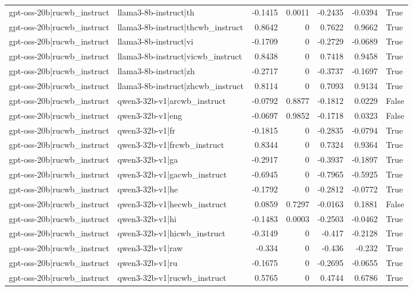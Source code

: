 \begin{table}
\begin{tabular}{l l r r r r l}
gpt-oss-20b|rucwb_instruct & llama3-8b-instruct|th & -0.1415 & 0.0011 & -0.2435 & -0.0394 & True \\
gpt-oss-20b|rucwb_instruct & llama3-8b-instruct|thcwb_instruct & 0.8642 & 0 & 0.7622 & 0.9662 & True \\
gpt-oss-20b|rucwb_instruct & llama3-8b-instruct|vi & -0.1709 & 0 & -0.2729 & -0.0689 & True \\
gpt-oss-20b|rucwb_instruct & llama3-8b-instruct|vicwb_instruct & 0.8438 & 0 & 0.7418 & 0.9458 & True \\
gpt-oss-20b|rucwb_instruct & llama3-8b-instruct|zh & -0.2717 & 0 & -0.3737 & -0.1697 & True \\
gpt-oss-20b|rucwb_instruct & llama3-8b-instruct|zhcwb_instruct & 0.8114 & 0 & 0.7093 & 0.9134 & True \\
gpt-oss-20b|rucwb_instruct & qwen3-32b-v1|arcwb_instruct & -0.0792 & 0.8877 & -0.1812 & 0.0229 & False \\
gpt-oss-20b|rucwb_instruct & qwen3-32b-v1|eng & -0.0697 & 0.9852 & -0.1718 & 0.0323 & False \\
gpt-oss-20b|rucwb_instruct & qwen3-32b-v1|fr & -0.1815 & 0 & -0.2835 & -0.0794 & True \\
gpt-oss-20b|rucwb_instruct & qwen3-32b-v1|frcwb_instruct & 0.8344 & 0 & 0.7324 & 0.9364 & True \\
gpt-oss-20b|rucwb_instruct & qwen3-32b-v1|ga & -0.2917 & 0 & -0.3937 & -0.1897 & True \\
gpt-oss-20b|rucwb_instruct & qwen3-32b-v1|gacwb_instruct & -0.6945 & 0 & -0.7965 & -0.5925 & True \\
gpt-oss-20b|rucwb_instruct & qwen3-32b-v1|he & -0.1792 & 0 & -0.2812 & -0.0772 & True \\
gpt-oss-20b|rucwb_instruct & qwen3-32b-v1|hecwb_instruct & 0.0859 & 0.7297 & -0.0163 & 0.1881 & False \\
gpt-oss-20b|rucwb_instruct & qwen3-32b-v1|hi & -0.1483 & 0.0003 & -0.2503 & -0.0462 & True \\
gpt-oss-20b|rucwb_instruct & qwen3-32b-v1|hicwb_instruct & -0.3149 & 0 & -0.417 & -0.2128 & True \\
gpt-oss-20b|rucwb_instruct & qwen3-32b-v1|raw & -0.334 & 0 & -0.436 & -0.232 & True \\
gpt-oss-20b|rucwb_instruct & qwen3-32b-v1|ru & -0.1675 & 0 & -0.2695 & -0.0655 & True \\
gpt-oss-20b|rucwb_instruct & qwen3-32b-v1|rucwb_instruct & 0.5765 & 0 & 0.4744 & 0.6786 & True \\

\end{tabular}
\end{table}
